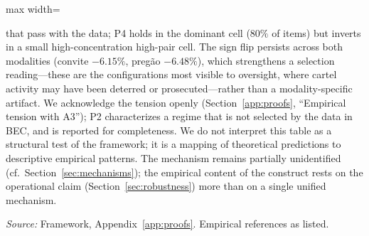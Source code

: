 \begin{table}[htbp]
\begin{adjustbox}{max width=\textwidth}
\begin{threeparttable}
\begin{tablenotes}
that pass with the data; P4 holds in the dominant cell
($80\%$ of items) but inverts in a small high-concentration
high-pair cell. The sign flip persists across both modalities
(convite $-6.15\%$, preg\~ao $-6.48\%$), which strengthens a
selection reading---these are the configurations most visible
to oversight, where cartel activity may have been deterred or
prosecuted---rather than a modality-specific artifact. We
acknowledge the tension openly
(Section~\ref{app:proofs}, ``Empirical tension with A3''); P2
characterizes a regime that is not selected by the data in
BEC, and is reported for completeness. We do not interpret
this table as a structural test of the framework; it is a
mapping of theoretical predictions to descriptive empirical
patterns. The mechanism remains partially unidentified (cf.\
Section~\ref{sec:mechanisms}); the empirical content of the
construct rests on the operational claim
(Section~\ref{sec:robustness}) more than on a single unified
mechanism.
\item \textit{Source:} Framework, Appendix~\ref{app:proofs}.
Empirical references as listed.
\end{tablenotes}
\end{threeparttable}
\end{adjustbox}
\end{table}
